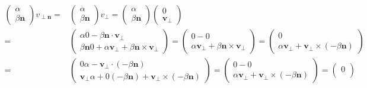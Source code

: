 \documentclass[
]{book}
\theoremstyle{definition}
\theoremstyle{definition}
\theoremstyle{definition}
\theoremstyle{definition}
\theoremstyle{remark}
\begin{document}
\[
\begin{aligned}
\begin{pmatrix}\alpha\\
\beta\boldsymbol{n}
\end{pmatrix}v_{{\scriptscriptstyle \perp\boldsymbol{n}}}= & \begin{pmatrix}\alpha\\
\beta\boldsymbol{n}
\end{pmatrix}v_{{\scriptscriptstyle \perp}}=\begin{pmatrix}\alpha\\
\beta\boldsymbol{n}
\end{pmatrix}\begin{pmatrix}0\\
\boldsymbol{v}_{{\scriptscriptstyle \perp}}
\end{pmatrix}\\
= & \begin{pmatrix}\alpha0-\beta\boldsymbol{n}\cdot\boldsymbol{v}_{{\scriptscriptstyle \perp}}\\
\beta\boldsymbol{n}0+\alpha\boldsymbol{v}_{{\scriptscriptstyle \perp}}+\beta\boldsymbol{n}\times\boldsymbol{v}_{{\scriptscriptstyle \perp}}
\end{pmatrix}=\begin{pmatrix}0-0\\
\alpha\boldsymbol{v}_{{\scriptscriptstyle \perp}}+\beta\boldsymbol{n}\times\boldsymbol{v}_{{\scriptscriptstyle \perp}}
\end{pmatrix}=\begin{pmatrix}0\\
\alpha\boldsymbol{v}_{{\scriptscriptstyle \perp}}+\boldsymbol{v}_{{\scriptscriptstyle \perp}}\times\left(-\beta\boldsymbol{n}\right)
\end{pmatrix}\\
= & \begin{pmatrix}0\alpha-\boldsymbol{v}_{{\scriptscriptstyle \perp}}\cdot\left(-\beta\boldsymbol{n}\right)\\
\boldsymbol{v}_{{\scriptscriptstyle \perp}}\alpha+0\left(-\beta\boldsymbol{n}\right)+\boldsymbol{v}_{{\scriptscriptstyle \perp}}\times\left(-\beta\boldsymbol{n}\right)
\end{pmatrix}=\begin{pmatrix}0-0\\
\alpha\boldsymbol{v}_{{\scriptscriptstyle \perp}}+\boldsymbol{v}_{{\scriptscriptstyle \perp}}\times\left(-\beta\boldsymbol{n}\right)
\end{pmatrix}=\begin{pmatrix}0\\

\end{pmatrix}
\end{aligned}\]
\end{document}

